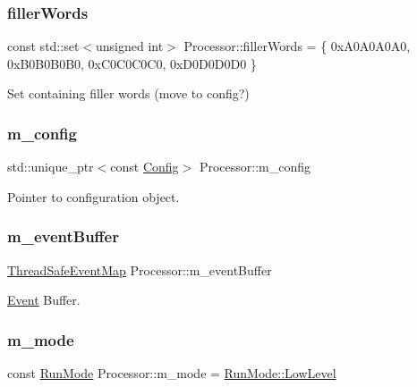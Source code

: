 \subsubsection{\texorpdfstring{filler\+Words}{fillerWords}}
{\footnotesize\ttfamily const std\+::set$<$unsigned int$>$ Processor\+::filler\+Words = \{ 0x\+A0\+A0\+A0\+A0, 0x\+B0\+B0\+B0\+B0, 0x\+C0\+C0\+C0\+C0, 0x\+D0\+D0\+D0\+D0 \}\hspace{0.3cm}{\ttfamily [private]}}



Set containing filler words (move to config?) 

\mbox{\label{class_processor_aa1ac0a603b269d9f0e1a90ec318c1525}} 
\subsubsection{\texorpdfstring{m\+\_\+config}{m\_config}}
{\footnotesize\ttfamily std\+::unique\+\_\+ptr$<$const \hyperlink{class_config}{Config}$>$ Processor\+::m\+\_\+config\hspace{0.3cm}{\ttfamily [private]}}



Pointer to configuration object. 

\mbox{\label{class_processor_a7cb15fbab19fceb6bc5a607629ff5040}} 
\subsubsection{\texorpdfstring{m\+\_\+event\+Buffer}{m\_eventBuffer}}
{\footnotesize\ttfamily \hyperlink{class_thread_safe_event_map}{Thread\+Safe\+Event\+Map} Processor\+::m\+\_\+event\+Buffer\hspace{0.3cm}{\ttfamily [private]}}



\hyperlink{class_event}{Event} Buffer. 

\mbox{\label{class_processor_ac22f412163181f546d847ce23d71978d}} 
\subsubsection{\texorpdfstring{m\+\_\+mode}{m\_mode}}
{\footnotesize\ttfamily const \hyperlink{_modes_enum_8hpp_a3dfe11cf1a3a8121f6cd7fec4bf5947e}{Run\+Mode} Processor\+::m\+\_\+mode = \hyperlink{_modes_enum_8hpp_a3dfe11cf1a3a8121f6cd7fec4bf5947ea8cf5e1a2a32430916501be0579e5303b}{Run\+Mode\+::\+Low\+Level}\hspace{0.3cm}{\ttfamily [private]}}



